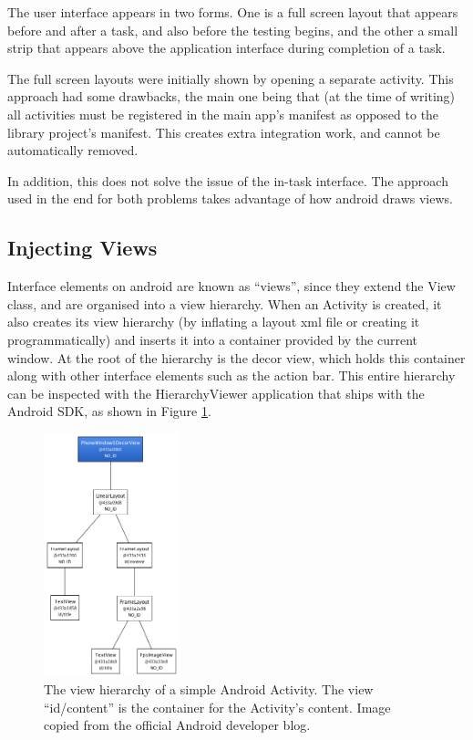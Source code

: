 The user interface appears in two forms. One is a full screen layout
that appears before and after a task, and also before the testing
begins, and the other a small strip that appears above the 
application interface during completion of a task.

The full screen layouts were initially shown by opening a separate
activity. This approach had some drawbacks, the main one being that
(at the time of writing) all activities must be registered in the
main app's manifest as opposed to the library project's manifest.
This creates extra integration work, and cannot be automatically
removed. 

In addition, this does not solve the issue of the in-task interface.
The approach used in the end for both problems takes advantage of
how android draws views.

\subsection{Injecting Views}

Interface elements on android are known as ``views'', since they
extend the View class, and are organised into a view hierarchy.
When an Activity is created, it also creates its view hierarchy
(by inflating a layout xml file or creating it programmatically)
and inserts it into a container provided by the current window.
At the root of the hierarchy is the decor view, which holds this
container along with other interface elements such as the action
bar. This entire hierarchy can be inspected with the HierarchyViewer
application that ships with the Android SDK, as shown in Figure
\ref{fig:view-hierarchy}.

\begin{figure}[h]
  \centering
  \includegraphics[width=0.35\textwidth]{images/view-hierarchy}
  \caption{The view hierarchy of a simple Android Activity. The
           view ``id/content'' is the container for the Activity's
           content. Image copied from the official Android 
           developer blog.}
  \label{fig:view-hierarchy}
\end{figure}

